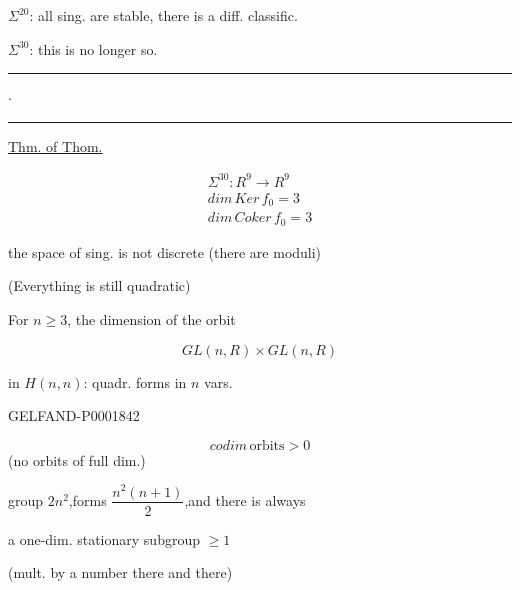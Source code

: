$\Sigma^{20}$: all sing. are stable, there is a diff. classific.

$\Sigma^{30}$: this is no longer so.
\begin{center}\rule{12mm}{.4pt}\kern2mm$\cdot$\kern2mm\rule{12mm}{.4pt}\end{center}

\underline{Thm. of Thom.}

\begin{gather*}
\Sigma^{30}: R^9\longrightarrow R^9\\
dim\, Ker\, f_0=3\\
dim\, Coker\, f_0=3
\end{gather*}

the space of sing. is not discrete (there are moduli)

(Everything is still quadratic)

 For $n\geq3$, the dimension of the orbit

\begin{equation*}GL (n, R)\times GL (n, R)\end{equation*}

in $H (n, n)$: quadr. forms in $n$ vars.

\begin{GelfandAdjacentEvidence}{GELFAND-P000184}{2}
\begin{center}
\end{center}
\end{GelfandAdjacentEvidence}

\begin{equation*}codim\,\text{orbits}>0\end{equation*}
(no orbits of full dim.)

group $2n^2$,\qquad forms $\dfrac{n^2(n+1)}2$,\qquad and there is always

a one-dim. stationary subgroup $\geq1$

(mult. by a number there and there)

